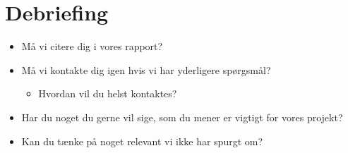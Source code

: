 \section{Debriefing}
\begin{itemize}
    \item Må vi citere dig i vores rapport?
    \item Må vi kontakte dig igen hvis vi har yderligere spørgsmål?
    \begin{itemize}
        \item Hvordan vil du helst kontaktes?
    \end{itemize}
    \item Har du noget du gerne vil sige, som du mener er vigtigt for vores projekt?
    \item Kan du tænke på noget relevant vi ikke har spurgt om?
\end{itemize}